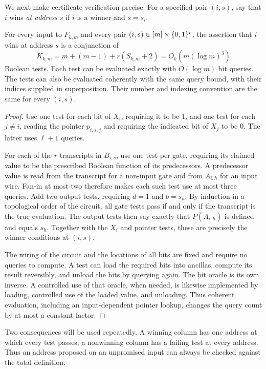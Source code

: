 
\FloatBarrier

We next make certificate verification precise.  For a specified pair
$(i,s)$, say that $i$ wins \emph{at address $s$} if $i$ is a winner and
$s=s_i$.

\begin{lemma}\label{lem:local-tests}
For every input to $F_{k,m}$ and every pair $(i,s)\in[m]\times\{0,1\}^r$,
the assertion that $i$ wins at address $s$ is a conjunction of
\[
 K_{k,m}=m+(m-1)+r(S_{k,m}+2)
        =O_k(m(\log m)^3)
\]
Boolean tests.  Each test can be evaluated exactly with $O(\log m)$ bit
queries.  The tests can also be evaluated coherently with the same query
bound, with their indices supplied in superposition.  Their number and
indexing convention are the same for every $(i,s)$.
\end{lemma}

\begin{proof}
Use one test for each bit of $X_i$, requiring it to be 1, and one test
for each $j\ne i$, reading the pointer $p_{i,s,j}$ and requiring the
indicated bit of $X_j$ to be 0.  The latter uses $\ell+1$ queries.

For each of the $r$ transcripts in $B_{i,s}$, use one test per gate,
requiring its claimed value to be the prescribed Boolean function of its
predecessors.  A predecessor value is read from the transcript for a
non-input gate and from $A_{i,h}$ for an input wire.  Fan-in at most two
therefore makes each such test use at most three queries.  Add two output
tests, requiring $d=1$ and $b=s_h$.  By induction in a topological order
of the circuit, all gate tests pass if and only if the transcript is the
true evaluation.  The output tests then say exactly that $P(A_{i,h})$ is
defined and equals $s_h$.  Together with the $X_i$ and pointer tests,
these are precisely the winner conditions at $(i,s)$.

The wiring of the circuit and the locations of all bits are fixed and
require no queries to compute.  A test can load the required bits into
ancillas, compute its result reversibly, and unload the bits by querying
again.  The bit oracle is its own inverse.  A controlled use of that
oracle, when needed, is likewise implemented by loading, controlled use
of the loaded value, and unloading.  Thus coherent evaluation, including
an input-dependent pointer lookup, changes the query count by at most a
constant factor.
\end{proof}

Two consequences will be used repeatedly.  A winning column has one
address at which every test passes; a nonwinning column has a failing
test at every address.  Thus an address proposed on an unpromised input
can always be checked against the total definition.
